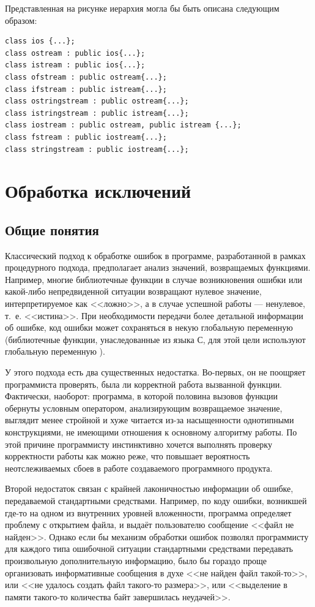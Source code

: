 Представленная на рисунке иерархия могла бы быть описана следующим образом: 
\begin{lstlisting}
class ios {...};
class ostream : public ios{...};
class istream : public ios{...};
class ofstream : public ostream{...};
class ifstream : public istream{...};
class ostringstream : public ostream{...};
class istringstream : public istream{...};
class iostream : public ostream, public istream {...};
class fstream : public iostream{...};
class stringstream : public iostream{...};
\end{lstlisting}

\section[Обработка исключений]{Обработка исключений}
\subsection[Общие понятия]{Общие понятия}
Классический подход к обработке ошибок в программе, разработанной в рамках процедурного подхода, предполагает анализ
значений, возвращаемых функциями. Например, многие библиотечные функции в случае возникновения ошибки или какой-либо
непредвиденной ситуации возвращают нулевое значение, интерпретируемое как <<ложно>>, а в случае успешной работы ---
ненулевое, т.~е. <<истина>>. При необходимости передачи более детальной информации об ошибке, код ошибки может
сохраняться в некую глобальную переменную (библиотечные функции, унаследованные из языка С,  для этой цели используют
глобальную переменную ).

У этого подхода есть два существенных недостатка. Во-первых, он не поощряет программиста проверять, была ли корректной
работа вызванной функции. Фактически, наоборот: программа, в которой половина вызовов функции обернуты условным
оператором, анализирующим возвращаемое значение, выглядит менее стройной и хуже читается из-за насыщенности однотипными
конструкциями, не имеющими отношения к основному алгоритму работы. По этой причине программисту инстинктивно хочется
выполнять проверку корректности работы как можно реже, что повышает вероятность неотслеживаемых сбоев в работе
создаваемого программного продукта. 

Второй недостаток связан с крайней лаконичностью информации об ошибке, передаваемой стандартными средствами. Например,
по коду ошибки, возникшей где-то на одном из внутренних уровней вложенности, программа определяет проблему с открытием
файла, и выдаёт пользователю сообщение <<файл не найден>>. Однако если бы механизм обработки ошибок позволял программисту
для каждого типа ошибочной ситуации стандартными средствами передавать произвольную дополнительную информацию, было бы
гораздо проще организовать информативные сообщения в духе <<не найден файл такой-то>>, или <<не удалось создать файл
такого-то размера>>, или <<выделение в памяти такого-то количества байт завершилась неудачей>>. 

